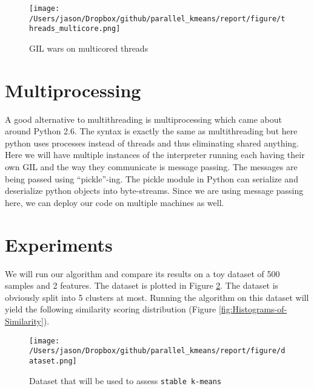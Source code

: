 \documentclass[a0paper,smallertitle]{HYposter}
\begin{document}
\begin{figure}[H] 
\texttt{[image: /Users/jason/Dropbox/github/parallel\_kmeans/report/figure/threads\_multicore.png]}
\caption{GIL wars on multicored threads}
\label{fig:GIL-wars-on}
\end{figure}


\section*{Multiprocessing}

A good alternative to multithreading is multiprocessing which came
about around Python 2.6. The syntax is exactly the same as multithreading
but here python uses processes instead of threads and thus eliminating
shared anything. Here we will have multiple instances of the interpreter
running each having their own GIL and the way they communicate is
message passing. The messages are being passed using ``pickle''-ing.
The pickle module in Python can serialize and deserialize python objects
into byte-streams. Since we are using message passing here, we can
deploy our code on multiple machines as well. 

\section*{Experiments} \label{implementation}

We will run our algorithm and compare its results on a toy dataset
of 500 samples and 2 features. The dataset is plotted in Figure \ref{fig:Dataset-that-will}. The dataset is obviously split into 5 clusters at most. Running the
algorithm on this dataset will yield the following similarity scoring
distribution (Figure \ref{fig:Histograms-of-Similarity}).

\begin{figure}[H] 
\texttt{[image: /Users/jason/Dropbox/github/parallel\_kmeans/report/figure/dataset.png]}
\caption{\label{fig:Dataset-that-will}Dataset that will be used to assess
\texttt{stable k-means}}
\end{figure}
\end{document}
